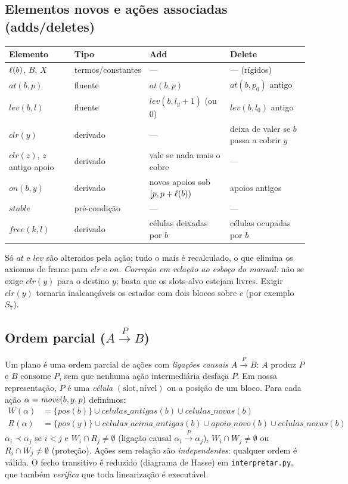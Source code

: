 \documentclass[11pt,a4paper]{article}
\newcommand{\at}{\mathit{at}}\newcommand{\lev}{\mathit{lev}}\newcommand{\clr}{\mathit{clr}}
\begin{document}
\subsection{Elementos novos e ações associadas (adds/deletes)}
\begin{center}\small
\begin{tabular}{@{}p{3.0cm}p{2.3cm}p{3.5cm}p{4.0cm}@{}}\toprule
Elemento & Tipo & Add & Delete\\\midrule
$\ell(b)$, $B$, $X$ & termos/constantes & --- & --- (rígidos)\\
$\at(b,p)$ & fluente & $\at(b,p)$ & $\at(b,p_0)$ antigo\\
$\lev(b,l)$ & fluente & $\lev(b,l_y+1)$ (ou $0$) & $\lev(b,l_0)$ antigo\\
$\clr(y)$ & derivado & --- & deixa de valer se $b$ passa a cobrir $y$\\
$\clr(z)$, $z$ antigo apoio & derivado & vale se nada mais o cobre & ---\\
$\mathit{on}(b,y)$ & derivado & novos apoios sob $[p,p+\ell(b))$ & apoios antigos\\
$\mathit{stable}$ & pré-condição & --- & ---\\
$\mathit{free}(k,l)$ & derivado & células deixadas por $b$ & células ocupadas por $b$\\\bottomrule
\end{tabular}\end{center}
Só $\at$ e $\lev$ são alterados pela ação; tudo o mais é recalculado, o que elimina os axiomas de frame para $\clr$ e $\mathit{on}$.
\emph{Correção em relação ao esboço do manual:} não se exige $\clr(y)$ para o destino $y$; basta que os slots-alvo estejam livres. Exigir $\clr(y)$ tornaria inalcançáveis os estados com dois blocos sobre $c$ (por exemplo $S_7$).

\subsection{Ordem parcial ($A\xrightarrow{P}B$)}
Um plano é uma ordem parcial de ações com \emph{ligações causais} $A\xrightarrow{P}B$: $A$ produz $P$ e $B$ consome $P$, sem
que nenhuma ação intermediária desfaça $P$. Em nossa representação, $P$ é uma \emph{célula} $(\text{slot},\text{nível})$ ou a posição de um bloco.
Para cada ação $\alpha=\mathit{move}(b,y,p)$ definimos:
\begin{align*}
W(\alpha)&=\{\mathit{pos}(b)\}\cup\mathit{celulas\_antigas}(b)\cup\mathit{celulas\_novas}(b)\\
R(\alpha)&=\{\mathit{pos}(y)\}\cup\mathit{celulas\_acima\_antigas}(b)\cup\mathit{apoio\_novo}(b)\cup\mathit{celulas\_novas}(b)
\end{align*}
$\alpha_i\prec\alpha_j$ se $i<j$ e $W_i\cap R_j\neq\emptyset$ (ligação causal $\alpha_i\xrightarrow{P}\alpha_j$),
$W_i\cap W_j\neq\emptyset$ ou $R_i\cap W_j\neq\emptyset$ (proteção). Ações sem relação são \emph{independentes}: qualquer ordem
é válida. O fecho transitivo é reduzido (diagrama de Hasse) em \texttt{interpretar.py}, que também \emph{verifica} que toda linearização é executável.
\end{document}
